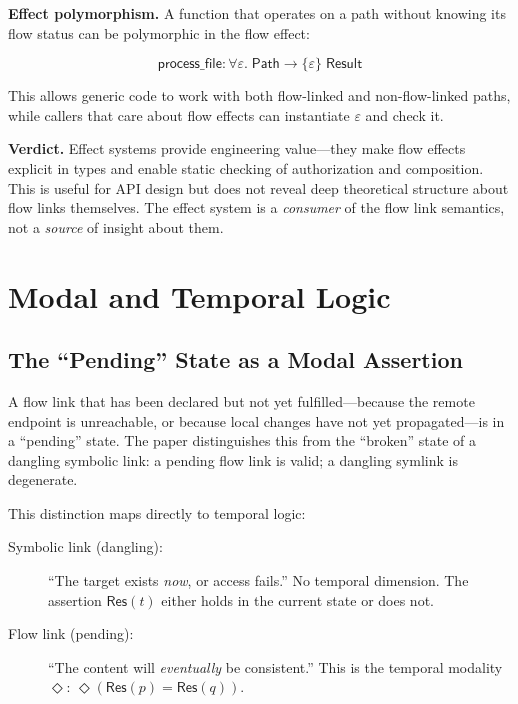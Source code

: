 \documentclass[11pt]{article}
\newcommand{\tp}[1]{\mathsf{#1}}
\newcommand{\eventually}{\Diamond}
\begin{document}
\textbf{Effect polymorphism.} A function that operates on a path without
knowing its flow status can be polymorphic in the flow effect:

\[
  \tp{process\_file} : \forall \varepsilon.\; \tp{Path} \to
    \{\varepsilon\}\; \tp{Result}
\]

This allows generic code to work with both flow-linked and non-flow-linked
paths, while callers that care about flow effects can instantiate $\varepsilon$
and check it.

\textbf{Verdict.} Effect systems provide engineering value---they make flow
effects explicit in types and enable static checking of authorization and
composition. This is useful for API design but does not reveal deep theoretical
structure about flow links themselves. The effect system is a \emph{consumer}
of the flow link semantics, not a \emph{source} of insight about them.


\section{Modal and Temporal Logic}\label{sec:modal}

\subsection{The ``Pending'' State as a Modal Assertion}

A flow link that has been declared but not yet fulfilled---because the remote
endpoint is unreachable, or because local changes have not yet propagated---is
in a ``pending'' state. The paper distinguishes this from the ``broken'' state
of a dangling symbolic link: a pending flow link is valid; a dangling symlink
is degenerate.

This distinction maps directly to temporal logic:

\begin{description}
  \item[Symbolic link (dangling):] ``The target exists \emph{now}, or access
    fails.'' No temporal dimension. The assertion $\tp{Res}(t)$ either holds
    in the current state or does not.
  \item[Flow link (pending):] ``The content will \emph{eventually} be
    consistent.'' This is the temporal modality $\eventually$: $\eventually
    (\tp{Res}(p) = \tp{Res}(q))$.
\end{description}
\end{document}
